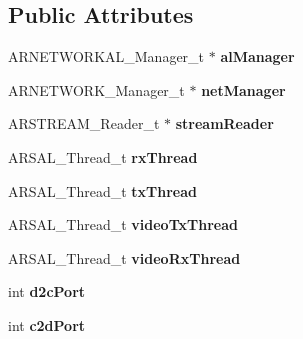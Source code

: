 \subsection*{Public Attributes}
\begin{DoxyCompactItemize}
\item 
\hypertarget{structBD__MANAGER__t_a72f94bb1cd0f3fc17091f33ef86b9854}{}A\+R\+N\+E\+T\+W\+O\+R\+K\+A\+L\+\_\+\+Manager\+\_\+t $\ast$ {\bfseries al\+Manager}\label{structBD__MANAGER__t_a72f94bb1cd0f3fc17091f33ef86b9854}

\item 
\hypertarget{structBD__MANAGER__t_aa206d61e05f8bbd07c8f2fb95fb2c9de}{}A\+R\+N\+E\+T\+W\+O\+R\+K\+\_\+\+Manager\+\_\+t $\ast$ {\bfseries net\+Manager}\label{structBD__MANAGER__t_aa206d61e05f8bbd07c8f2fb95fb2c9de}

\item 
\hypertarget{structBD__MANAGER__t_aa4299944778f151a55ee726fe1ac1c5b}{}A\+R\+S\+T\+R\+E\+A\+M\+\_\+\+Reader\+\_\+t $\ast$ {\bfseries stream\+Reader}\label{structBD__MANAGER__t_aa4299944778f151a55ee726fe1ac1c5b}

\item 
\hypertarget{structBD__MANAGER__t_aa4735b3bb6c989bfcd6cb51e90789b44}{}A\+R\+S\+A\+L\+\_\+\+Thread\+\_\+t {\bfseries rx\+Thread}\label{structBD__MANAGER__t_aa4735b3bb6c989bfcd6cb51e90789b44}

\item 
\hypertarget{structBD__MANAGER__t_a5ab27da27e34c5e76dbbc033fe99d080}{}A\+R\+S\+A\+L\+\_\+\+Thread\+\_\+t {\bfseries tx\+Thread}\label{structBD__MANAGER__t_a5ab27da27e34c5e76dbbc033fe99d080}

\item 
\hypertarget{structBD__MANAGER__t_a14246d06a707dcb4bcf0dc2f541ee09c}{}A\+R\+S\+A\+L\+\_\+\+Thread\+\_\+t {\bfseries video\+Tx\+Thread}\label{structBD__MANAGER__t_a14246d06a707dcb4bcf0dc2f541ee09c}

\item 
\hypertarget{structBD__MANAGER__t_a7b58d261b275c75e79b7345476983e1c}{}A\+R\+S\+A\+L\+\_\+\+Thread\+\_\+t {\bfseries video\+Rx\+Thread}\label{structBD__MANAGER__t_a7b58d261b275c75e79b7345476983e1c}

\item 
\hypertarget{structBD__MANAGER__t_a9bcabdb60dcfffe872d576b2257583fe}{}int {\bfseries d2c\+Port}\label{structBD__MANAGER__t_a9bcabdb60dcfffe872d576b2257583fe}

\item 
\hypertarget{structBD__MANAGER__t_a5dd5fc716f1c7c84031e7e016a0f14f3}{}int {\bfseries c2d\+Port}\label{structBD__MANAGER__t_a5dd5fc716f1c7c84031e7e016a0f14f3}


\end{DoxyCompactItemize}

